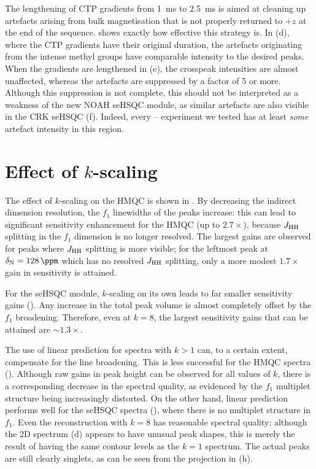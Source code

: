 The lengthening of CTP gradients from \SI{1}{\ms} to \SI{2.5}{\ms} is aimed at cleaning up artefacts arising from bulk magnetisation that is not properly returned to $+z$ at the end of the sequence.
 shows exactly how effective this strategy is.
In (d), where the CTP gradients have their original duration, the artefacts originating from the intense methyl groups have comparable intensity to the desired peaks.
When the gradients are lengthened in (e), the crosspeak intensities are almost unaffected, whereas the artefacts are suppressed by a factor of 5 or more.
Although this suppression is not complete, this should not be interpreted as a weakness of the new NOAH seHSQC module, as similar artefacts are also visible in the CRK seHSQC (f).
Indeed, every \nitrogen{}--\proton{} experiment we tested has at least \textit{some} artefact intensity in this region.

\section{Effect of \texorpdfstring{$k$}{k}-scaling}

The effect of $k$-scaling on the HMQC is shown in .
By decreasing the indirect dimension resolution, the $f_1$ linewidths of the peaks increase: this can lead to significant sensitivity enhancement for the HMQC (up to $2.7 \times$), because $\jhh$ splitting in the $f_1$ dimension is no longer resolved.
The largest gains are observed for peaks where $\jhh$ splitting is more visible; for the leftmost peak at $\delta_{\ce{N}} = \SI{128}{\ppm}$ which has no resolved $\jhh$ splitting, only a more modest $1.7 \times$ gain in sensitivity is attained.

For the seHSQC module, $k$-scaling on its own leads to far smaller sensitivity gains ().
Any increase in the total peak volume is almost completely offset by the $f_1$ broadening.
Therefore, even at $k = 8$, the largest sensitivity gains that can be attained are $\sim 1.3\times$.

The use of linear prediction for spectra with $k > 1$ can, to a certain extent, compensate for the line broadening.
This is less successful for the HMQC spectra ().
Although raw gains in peak height can be observed for all values of $k$, there is a corresponding decrease in the spectral quality, as evidenced by the $f_1$ multiplet structure being increasingly distorted.
On the other hand, linear prediction performs well for the seHSQC spectra (), where there is no multiplet structure in $f_1$.
Even the reconstruction with $k = 8$ has reasonable spectral quality: although the 2D spectrum (d) appears to have unusual peak shapes, this is merely the result of having the same contour levels as the $k = 1$ spectrum.
The actual peaks are still clearly singlets, as can be seen from the projection in (h).

